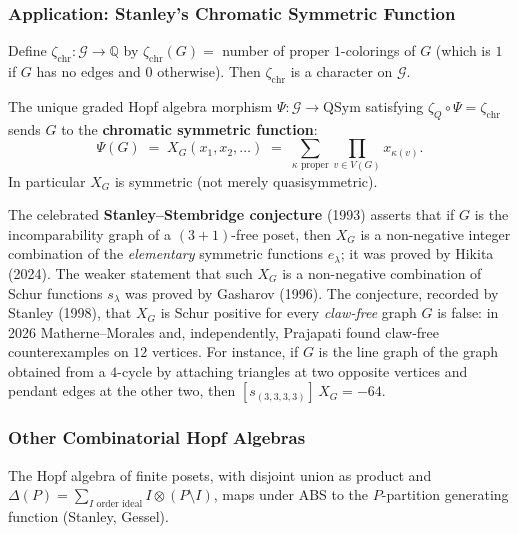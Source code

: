 \subsubsection{Application: Stanley's Chromatic Symmetric Function}

\begin{definition}
Define $\zeta_{\mathrm{chr}} : \mathcal G \to \mathbb Q$ by
$\zeta_{\mathrm{chr}}(G) = $ number of proper $1$-colorings of $G$
(which is $1$ if $G$ has no edges and $0$ otherwise). Then
$\zeta_{\mathrm{chr}}$ is a character on $\mathcal G$.
\end{definition}

\begin{theorem}\label{thm:stanleychr}
The unique graded Hopf algebra morphism $\Psi : \mathcal G \to \mathrm{QSym}$
satisfying $\zeta_Q \circ \Psi = \zeta_{\mathrm{chr}}$ sends $G$ to the
\textbf{chromatic symmetric function}:
\[
  \Psi(G) \;=\; X_G(x_1, x_2, \ldots) \;=\; \sum_{\kappa \text{ proper}} \prod_{v \in V(G)} x_{\kappa(v)}.
\]
In particular $X_G$ is symmetric (not merely quasisymmetric).
\end{theorem}

\begin{remark}[Positivity of $X_G$]
The celebrated \textbf{Stanley--Stembridge conjecture} (1993) asserts
that if $G$ is the incomparability graph of a $(3+1)$-free poset, then
$X_G$ is a non-negative integer combination of the \emph{elementary}
symmetric functions $e_\lambda$; it was proved by Hikita (2024). The
weaker statement that such $X_G$ is a non-negative combination of
Schur functions $s_\lambda$ was proved by Gasharov (1996). The
conjecture, recorded by Stanley (1998), that $X_G$ is Schur positive
for every \emph{claw-free} graph $G$ is false: in 2026
Matherne--Morales and, independently, Prajapati found claw-free
counterexamples on $12$ vertices. For instance, if $G$ is the line
graph of the graph obtained from a $4$-cycle by attaching triangles at
two opposite vertices and pendant edges at the other two, then
$[s_{(3,3,3,3)}]\, X_G = -64$.
\end{remark}

\subsubsection{Other Combinatorial Hopf Algebras}

\begin{example}[Posets]
The Hopf algebra of finite posets, with disjoint union as product and
$\Delta(P) = \sum_{I \text{ order ideal}} I \otimes (P \setminus I)$,
maps under ABS to the $P$-partition generating function (Stanley,
Gessel).
\end{example}

